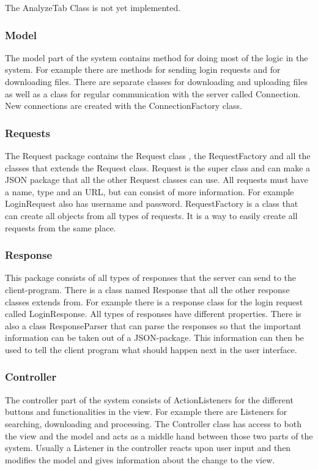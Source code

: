 The AnalyzeTab Class is not yet implemented.

\subsubsection{Model}
The model part of the system contains method for doing most of the logic in the system. For example there are methods for sending login requests and for downloading files. There are separate classes for downloading and uploading files as well as a class for regular communication with the server called Connection. New connections are created with the ConnectionFactory class.

\subsubsection{Requests}
The Request package contains the Request class , the RequestFactory and all the classes that extends the Request class. Request is the super class and can make a JSON package that all the other Request classes can use. All requests must have a name, type and an URL, but can consist of more information. For example LoginRequest also has username and password. RequestFactory is a class that can create all objects from all types of requests. It is a way to easily create all requests from the same place.


\subsubsection{Response}
This package consists of all types of responses that the server can send to the client-program. There is a class named Response that all the other response classes extends from. For example there is a response class for the login request called LoginResponse. All types of responses have different properties. There is also a class ResponseParser that can parse the responses so that the important information can be taken out of a JSON-package. This information can then be used to tell the client program what should happen next in the user interface.


\subsubsection{Controller}
The controller part of the system consists of ActionListeners for the different buttons and functionalities in the view. For example there are Listeners for searching, downloading and processing. The Controller class has access to both the view and the model and acts as a middle hand between those two parts of the system. Usually a Listener in the controller reacts upon user input and then modifies the model and gives information about the change to the view.


